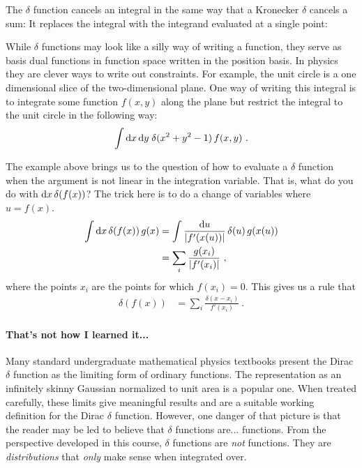 \documentclass[12pt, oneside]{report}    %
\begin{document}
\begin{subappendices}
The $\delta$ function cancels an integral in the same way that a Kronecker $\delta$ cancels a sum: It replaces the integral with the integrand evaluated at a single point:

While $\delta$ functions may look like a silly way of writing a function, they serve as basis dual functions in function space written in the position basis. In physics they are clever ways to write out constraints. For example, the unit circle is a one dimensional slice of the two-dimensional plane. One way of writing this integral is to integrate some function $f(x,y)$ along the plane but restrict the integral to the unit circle in the following way:
\begin{align}
    \int \operatorname{d}\!{x}\operatorname{d}\!{y}\; \delta(x^2 + y^2 - 1) \, f(x,y) \ .
\end{align}

The example above brings us to the question of how to evaluate a $\delta$ function when the argument is not linear in the integration variable. That is, what do you do with $\operatorname{d}\!{x}\, \delta(f(x))$? The trick here is to do a change of variables where $u = f(x)$.
\begin{align}
    \int \operatorname{d}\!{x}\, \delta(f(x))\, g(x)
    &= 
    \int \frac{\operatorname{d}\!{u}}{|f'(x(u))|} \, \delta(u) \, g(x(u))
    \\
    &= \sum_i\frac{g(x_i)}{|f'(x_i)|} \ ,
\end{align}
where the points $x_i$ are the points for which $f(x_i) = 0$. This gives us a rule that
\begin{align}
    \delta(f(x)) &= \sum_i \frac{\delta(x-x_i)}{f'(x_i)} \ .
\end{align}

\paragraph{That's not how I learned it...} Many standard undergraduate mathematical physics textbooks present the Dirac $\delta$ function as the limiting form of ordinary functions. The representation as an infinitely skinny Gaussian normalized to unit area is a popular one. When treated carefully, these limits give meaningful results and are a suitable working definition for the Dirac $\delta$ function. However, one danger of that picture is that the reader may be led to believe that $\delta$ functions are... functions. From the perspective developed in this course, $\delta$ functions are \emph{not} functions. They are \emph{distributions} that \emph{only} make sense when integrated over. 


\end{subappendices}
\end{document}
